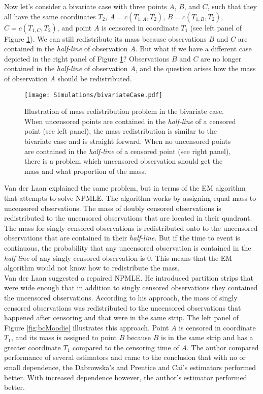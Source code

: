 \documentclass[]{article}
\begin{document}
Now let's consider a bivariate case with three points $A$, $B$, and $C$, such that they all have the same coordinates $T_2$, $A=c(T_{1,A}, T_2)$, $B=c(T_{1,B}, T_2)$, $C=c(T_{1,C}, T_2)$, and point $A$ is censored in coordinate $T_1$ (see left panel of Figure \ref{fig:bc}). We can still redistribute its mass because observations $B$ and $C$ are contained in the \emph{half-line} of observation $A$. But what if we have a different case depicted in the right panel of Figure \ref{fig:bc}? Observations $B$ and $C$ are no longer contained in the \emph{half-line} of observation $A$, and the question arises how the mass of observation $A$ should be redistributed. 

\begin{figure}[!h]
\caption[Illustration of mass redistribution problem in the bivariate case.]{Illustration of mass redistribution problem in the bivariate case. When uncensored points are contained in the \emph{half-line} of a censored point (see left panel), the mass redistribution is similar to the bivariate case and is straight forward. When no uncensored points are contained in the \emph{half-line} of a censored point (see right panel), there is a problem which uncensored observation should get the mass and what proportion of the mass.}
\texttt{[image: Simulations/bivariateCase.pdf]}
\label{fig:bc}
\end{figure}

Van der Laan explained the same problem, but in terms of the EM algorithm that attempts to solve NPMLE. The algorithm works by assigning equal mass to uncensored observations. The mass of doubly censored observations is redistributed to the uncensored observations that are located in their quadrant. The mass for singly censored observations is redistributed onto to the uncensored observations that are contained in their \emph{half-line}. But if the time to event is continuous, the probability that any uncensored observation is contained in the \emph{half-line} of any singly censored observation is $0$. This means that the EM algorithm would not know how to redistribute the mass.\\

Van der Laan suggested a repaired NPMLE. He introduced partition strips that were wide enough that in addition to singly censored observations they contained the uncensored observations. According to his approach, the mass of singly censored observations was redistributed to the uncensored observations that happened after censoring and that were in the same strip. The left panel of Figure \ref{fig:bcMoodie} illustrates this approach. Point $A$ is censored in coordinate $T_1$, and its mass is assigned to point $B$ because $B$ is in the same strip and has a greater coordinate $T_1$ compared to the censoring time of $A$.  The author compared performance of several estimators and came to the conclusion that with no or small dependence, the Dabrowska's and Prentice and Cai's estimators performed better. With increased dependence however, the author's estimator performed better.\\
\end{document}
